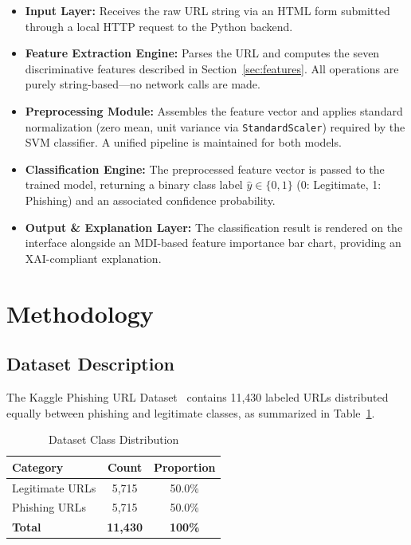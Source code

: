 \documentclass[conference]{IEEEtran}
\begin{document}
\begin{itemize}[leftmargin=*]
    \item \textbf{Input Layer:} Receives the raw URL string via an 
    HTML form submitted through a local HTTP request to the Python 
    backend.
    
    \item \textbf{Feature Extraction Engine:} Parses the URL and 
    computes the seven discriminative features described in 
    Section~\ref{sec:features}. All operations are purely 
    string-based—no network calls are made.
    
    \item \textbf{Preprocessing Module:} Assembles the feature 
    vector and applies standard normalization (zero mean, unit 
    variance via \texttt{StandardScaler}) required by the SVM 
    classifier. A unified pipeline is maintained for both models.
    
    \item \textbf{Classification Engine:} The preprocessed feature 
    vector is passed to the trained model, returning a binary class 
    label $\hat{y} \in \{0,1\}$ (0: Legitimate, 1: Phishing) and 
    an associated confidence probability.
    
    \item \textbf{Output \& Explanation Layer:} The classification 
    result is rendered on the interface alongside an MDI-based 
    feature importance bar chart, providing an 
    XAI-compliant explanation.
\end{itemize}

\section{Methodology}
\label{sec:method}

\subsection{Dataset Description}

The Kaggle Phishing URL Dataset~\cite{kaggle_dataset} contains 11,430 
labeled URLs distributed equally between phishing and legitimate classes, 
as summarized in Table~\ref{tab:dataset}.

\begin{table}[htbp]
\caption{Dataset Class Distribution}
\label{tab:dataset}
\centering
\renewcommand{\arraystretch}{1.2}
\begin{tabular}{lcc}
\toprule
\textbf{Category} & \textbf{Count} & \textbf{Proportion} \\
\midrule
Legitimate URLs & 5,715 & 50.0\% \\
Phishing URLs   & 5,715 & 50.0\% \\
\midrule
\textbf{Total}  & \textbf{11,430} & \textbf{100\%} \\
\bottomrule
\end{tabular}
\end{table}
\end{document}
